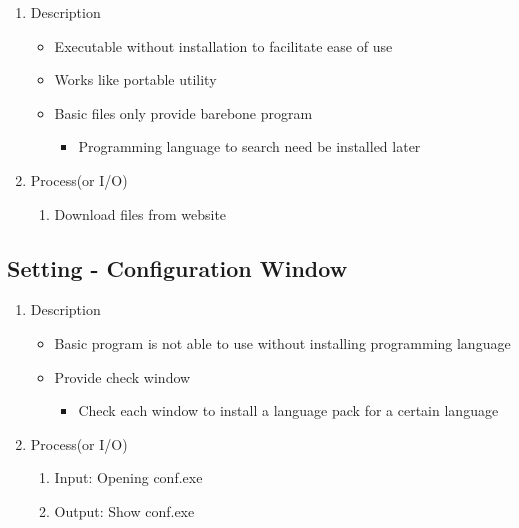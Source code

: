 \documentclass[conference]{IEEEtran}
\begin{document}
\begin{enumerate}
  \item Description
  \begin{itemize}
    \item Executable without installation to facilitate ease of use
    \item Works like portable utility
    \item Basic files only provide barebone program
    \begin{itemize}
      \item Programming language to search need be installed later
    \end{itemize}
  \end{itemize}
  \item Process(or I/O)
  \begin{enumerate}
    \item Download files from website
  \end{enumerate}
\end{enumerate}
\textit{}


\subsection{Setting - Configuration Window}

\begin{enumerate}
  \item Description
  \begin{itemize}
    \item Basic program is not able to use without installing programming language
    \item Provide check window
    \begin{itemize} 
      \item Check each window to install a language pack for a certain language 
    \end{itemize}
  \end{itemize}
  \item Process(or I/O)
  \begin{enumerate}
    \item Input: Opening conf.exe
    \item Output: Show conf.exe
  \end{enumerate}
\end{enumerate}

\textit{}
\end{document}

